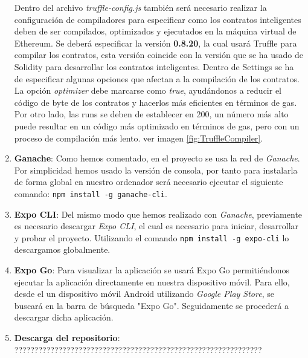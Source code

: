 \begin{enumerate}

Dentro del archivo \textit{truffle-config.js} también será necesario realizar la configuración de compiladores para especificar como los contratos inteligentes deben de ser compilados, optimizados y ejecutados en la máquina virtual de Ethereum.
Se deberá especificar la versión \textbf{0.8.20}, la cual usará Truffle para compilar los contratos, esta versión coincide con la versión que se ha usado de Solidity para desarrollar los contratos inteligentes.
Dentro de Settings se ha de especificar algunas opciones que afectan a la compilación de los contratos. La opción \textit{optimizer} debe marcarse como \textit{true}, ayudándonos a reducir el código de byte de los contratos y hacerlos más eficientes en términos de gas.
Por otro lado, las runs se deben de establecer en 200, un número más alto puede resultar en un código más optimizado en términos de gas, pero con un proceso de compilación más lento. ver imagen \ref{fig:TruffleCompiler}.


\item \textbf{Ganache}: Como hemos comentado, en el proyecto se usa la red de \textit{Ganache}. Por simplicidad hemos usado la versión de consola, por tanto para instalarla de forma global en nuestro ordenador será necesario ejecutar el siguiente comando: \texttt{npm install -g ganache-cli}.

\item \textbf{Expo CLI}: Del mismo modo que hemos realizado con \textit{Ganache}, previamente es necesario descargar \textit{Expo CLI}, el cual es necesario para iniciar, desarrollar y probar el proyecto.
Utilizando el comando \texttt{npm install -g expo-cli} lo descargamos globalmente.

\item \textbf{Expo Go}: Para visualizar la aplicación se usará Expo Go permitiéndonos ejecutar la aplicación directamente en nuestra dispositivo móvil.
Para ello, desde el un dispositivo móvil Android utilizando \textit{Google Play Store}, se buscará en la barra de búsqueda "Expo Go".  Seguidamente se procederá a descargar dicha aplicación.

\item \textbf{Descarga del repositorio}: ??????????????????????????????????????????????????????????????


\end{enumerate}


